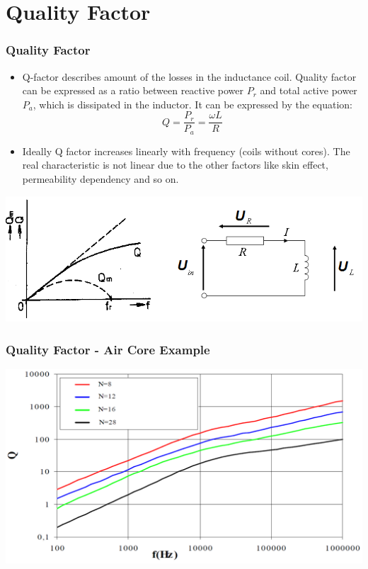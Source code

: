 \documentclass{beamer}
\begin{document}
\section{\texorpdfstring{Quality Factor}{Quality Factor}}
	\begin{frame}
	\frametitle{Quality Factor}
	\small
	\begin{itemize}
		\item Q-factor describes amount of the losses in the inductance coil. Quality factor can be expressed as a ratio between reactive power $P_r$ and total active power $P_a$, which is dissipated in the inductor. It can be expressed by the equation:
		$$Q = \frac{P_r}{P_a}=\frac{\omega L}{R}$$
		\item Ideally Q factor increases linearly with frequency (coils without cores). The real characteristic is not linear due to the other factors like skin effect, permeability dependency and so on.
	\end{itemize}
	\begin{center}
		\includegraphics[scale=0.4]{obr14_cinjakosti.png}
	\end{center}
  \end{frame}
	\begin{frame}
	\frametitle{Quality Factor - Air Core Example}
	\begin{center}
		\includegraphics[scale=0.3]{obr15_qGraf.png}
	\end{center}
  \end{frame}
\end{document}
